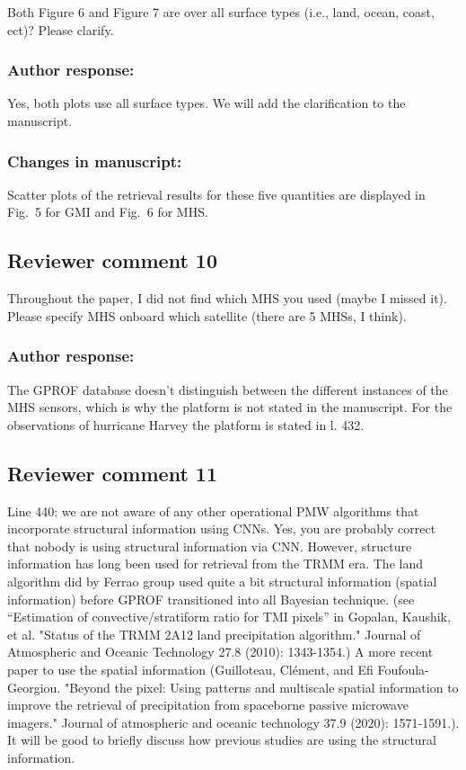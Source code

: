 Both Figure 6 and Figure 7 are over all surface types (i.e., land, ocean, coast, ect)? Please clarify.

\subsubsection*{Author response:}

Yes, both plots use all surface types. We will add the clarification to the manuscript.

\subsubsection*{Changes in manuscript:}

\begin{change}[297]
Scatter plots of the retrieval results for these five quantities \DIFaddbegin
{}\DIFaddend are displayed in
Fig.~5 for GMI and Fig.~6 for MHS.
\end{change}

\subsection*{Reviewer comment 10}

Throughout the paper, I did not find which MHS you used (maybe I missed it). Please specify
MHS onboard which satellite (there are 5 MHSs, I think).

\subsubsection*{Author response:}

The GPROF database doesn't distinguish between the different instances of the MHS sensors,
which is why the platform is not stated in the manuscript. For the observations of hurricane
Harvey the platform is stated in l. 432.

\subsection*{Reviewer comment 11}

Line 440: we are not aware of any other operational PMW algorithms that incorporate
structural information using CNNs. Yes, you are probably correct that nobody is using structural
information via CNN. However, structure information has long been used for retrieval from the
TRMM era. The land algorithm did by Ferrao group used quite a bit structural information
(spatial information) before GPROF transitioned into all Bayesian technique. (see “Estimation
of convective/stratiform ratio for TMI pixels” in Gopalan, Kaushik, et al. "Status of the TRMM
2A12 land precipitation algorithm." Journal of Atmospheric and Oceanic Technology 27.8
(2010): 1343-1354.) A more recent paper to use the spatial information (Guilloteau, Clément,
and Efi Foufoula-Georgiou. "Beyond the pixel: Using patterns and multiscale spatial information
to improve the retrieval of precipitation from spaceborne passive microwave imagers." Journal
of atmospheric and oceanic technology 37.9 (2020): 1571-1591.).
It will be good to briefly discuss how previous studies are using the structural information.

